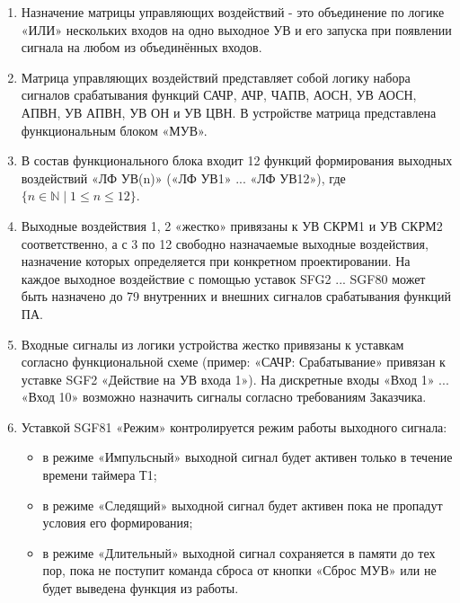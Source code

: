 
\color{black}

\begin{enumerate}

\item
Назначение матрицы управляющих воздействий - это объединение по логике «ИЛИ» нескольких входов на одно выходное УВ и его запуска при появлении сигнала на любом из объединённых входов.

\item
Матрица управляющих воздействий представляет собой логику набора сигналов срабатывания функций САЧР, АЧР, ЧАПВ, АОСН, УВ АОСН, АПВН, УВ АПВН, УВ ОН и УВ ЦВН. В устройстве матрица представлена функциональным блоком «МУВ».

\item
В состав функционального блока входит 12 функций формирования выходных воздействий «ЛФ УВ(n)» («ЛФ УВ1» ... «ЛФ УВ12»), где $\{n \in \mathbb{N} \mid 1 \leq n \leq 12\}$. 

\item
Выходные воздействия 1, 2 «жестко» привязаны к УВ СКРМ1 и УВ СКРМ2 соответственно, а с 3 по 12 свободно назначаемые выходные воздействия, назначение которых определяется при конкретном проектировании. На каждое выходное воздействие с помощью уставок SFG2 ... SGF80 может быть назначено до 79 внутренних и внешних сигналов срабатывания функций ПА.

\item
Входные сигналы из логики устройства жестко привязаны к уставкам согласно функциональной схеме (пример: «САЧР: Срабатывание» привязан к уставке SGF2 «Действие на УВ входа 1»). На дискретные входы «Вход 1» ... «Вход 10» возможно назначить сигналы согласно требованиям Заказчика.

\item
Уставкой SGF81 «Режим» контролируется режим работы выходного сигнала:
\begin{itemize}
    \item	в режиме «Импульсный» выходной сигнал будет активен только в течение времени таймера Т1;
    \item	в режиме «Следящий» выходной сигнал будет активен пока не пропадут условия его формирования;
    \item	в режиме «Длительный» выходной сигнал сохраняется в памяти до тех пор, пока не поступит команда сброса от кнопки «Сброс МУВ» или не будет выведена функция из работы.
\end{itemize}


\end{enumerate}
